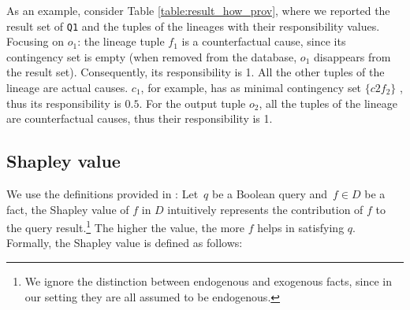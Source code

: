 \documentclass[preprint,12pt,sort&compress]{elsarticle}
\newtheorem{definition}{Definition}[section]
\newcommand{\eat}[1]{}
\begin{document}
As an example, consider Table \ref{table:result_how_prov}, where we reported the result set of \texttt{Q1} and the tuples of the lineages with their responsibility values. 
Focusing on $o_1$: the lineage tuple $f_1$ is a counterfactual cause, since its contingency set is empty (when removed from the database, $o_1$ disappears from the result set). Consequently, its responsibility is 1. All the other tuples of the lineage are actual causes. $c_1$, for example, has as minimal contingency set $\{c2f_2\}$ , thus its responsibility is $0.5$. 
For the output tuple $o_2$, all the tuples of the lineage are counterfactual causes, thus their responsibility is 1.


\subsection{Shapley value}
\label{sec:shapley_value}

\eat{
We use the definitions provided in \cite{DFKM22}:  
given a query $q(\bar{x})$, a database $D$, an input fact $f \in D$ and a tuple $\bar{t}$ of same arity as $\bar{x}$, the Shapley value of $f$ in $D$ intuitively represents the contribution of $f$ to the presence (or absence) of $\bar{t}$ in the query result.

\begin{definition}{Shapley value \cite{DFKM22}}\\
	Let the database instance $I$ be partitioned into two sets of facts: a set $I^x$ of  exogenous facts, and a set $I^n$ of endogenous facts. Let $Q$ be a Boolean query and $f \in I^n$ be an endogenous fact. The Shapley value of $f$ in $I$ for query $Q$ is defined as:
	\begin{multline*}
		Shapley(Q, I^n, I^x, f) = \\ \sum_{B \subseteq I^n\backslash \{ f \}}\frac{|B|!(|I^n| - |B| - 1)!}{|I^n|!}  \left(Q(I^x \cup B \cup \{ f\} ) - Q(I^x \cup B)\right)
	\end{multline*}
\end{definition}
}
We use the definitions provided in \cite{DFKM22}:  
Let~$q$ be a Boolean query and~$f
\in D$ be a fact, the Shapley value of $f$ in $D$ intuitively represents the contribution of $f$ to the query result.\footnote{We ignore the distinction between endogenous and exogenous facts, since in our setting they are all assumed to be endogenous. }
The higher the value, the more $f$ helps in satisfying $q$.
Formally, the Shapley value is defined as follows:
\end{document}
